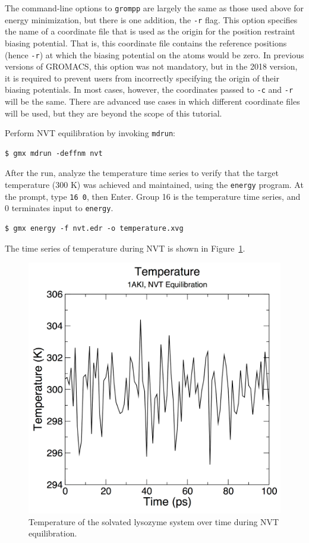 \documentclass[9pt,tutorial]{livecoms}
\begin{document}
The command-line options to \texttt{grompp} are largely the same as those used above for energy minimization, but there is one addition, the \texttt{-r} flag. This option specifies the name of a coordinate file that is used as the origin for the position restraint biasing potential. That is, this coordinate file contains the reference positions (hence \texttt{-r}) at which the biasing potential on the atoms would be zero. In previous versions of GROMACS, this option was not mandatory, but in the 2018 version, it is required to prevent users from incorrectly specifying the origin of their biasing potentials. In most cases, however, the coordinates passed to \texttt{-c} and \texttt{-r} will be the same. There are advanced use cases in which different coordinate files will be used, but they are beyond the scope of this tutorial.

Perform NVT equilibration by invoking \texttt{mdrun}:

\begin{verbatim}
$ gmx mdrun -deffnm nvt
\end{verbatim}

After the run, analyze the temperature time series to verify that the target temperature (300 K) was achieved and maintained, using the \texttt{energy} program. At the prompt, type \texttt{16 0}, then Enter. Group 16 is the temperature time series, and 0 terminates input to \texttt{energy}.

\begin{verbatim}
$ gmx energy -f nvt.edr -o temperature.xvg
\end{verbatim}

The time series of temperature during NVT is shown in Figure~\ref{lyso_nvt_temp_fig}.

\begin{figure}[h]
\centering
\includegraphics{plot_lyso_nvt_temperature}
\caption{Temperature of the solvated lysozyme system over time during NVT equilibration.}
\label{lyso_nvt_temp_fig}
\end{figure}
\end{document}
